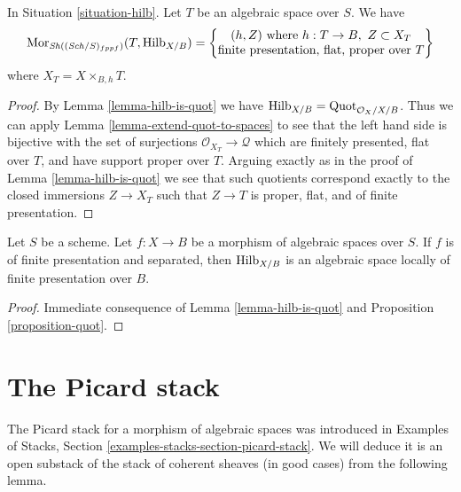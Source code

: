 \begin{lemma}
\label{lemma-extend-hilb-to-spaces}
In Situation \ref{situation-hilb}. Let $T$ be an algebraic space over $S$.
We have
$$
\mathop{\mathrm{Mor}}\nolimits_{\mathop{\mathit{Sh}}\nolimits((\mathit{Sch}/S)_{fppf})}(T, \mathrm{Hilb}_{X/B}) =
\left\{
\begin{matrix}
(h, Z)\text{ where }h : T \to B,\ Z \subset X_T \\
\text{finite presentation, flat, proper over }T
\end{matrix}
\right\}
$$
where $X_T = X \times_{B, h} T$.
\end{lemma}

\begin{proof}
By Lemma \ref{lemma-hilb-is-quot}
we have $\mathrm{Hilb}_{X/B} = \mathrm{Quot}_{\mathcal{O}_X/X/B}$.
Thus we can apply Lemma \ref{lemma-extend-quot-to-spaces}
to see that the left hand side is bijective with the set
of surjections $\mathcal{O}_{X_T} \to \mathcal{Q}$
which are finitely presented, flat over $T$, and
have support proper over $T$. Arguing exactly as in the
proof of Lemma \ref{lemma-hilb-is-quot}
we see that such quotients correspond
exactly to the closed immersions $Z \to X_T$ such that
$Z \to T$ is proper, flat, and of finite presentation.
\end{proof}

\begin{proposition}
\label{proposition-hilb}
Let $S$ be a scheme. Let $f : X \to B$ be a morphism of algebraic
spaces over $S$. If $f$ is of finite presentation and separated, then
$\mathrm{Hilb}_{X/B}$ is an algebraic space locally of finite
presentation over $B$.
\end{proposition}

\begin{proof}
Immediate consequence of
Lemma \ref{lemma-hilb-is-quot}
and Proposition \ref{proposition-quot}.
\end{proof}






\section{The Picard stack}
\label{section-picard-stack}

\noindent
The Picard stack for a morphism of algebraic spaces was introduced
in Examples of Stacks, Section \ref{examples-stacks-section-picard-stack}.
We will deduce it is an open substack of the stack of coherent sheaves
(in good cases) from the following lemma.

